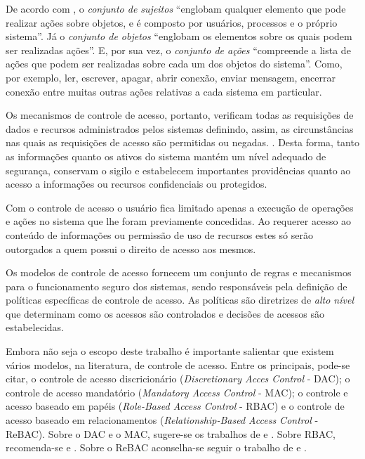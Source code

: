 De acordo com \cite[p. 8]{kropiwiec_policy_nodate}, o \textit{conjunto de sujeitos} ``englobam qualquer elemento que pode realizar ações sobre objetos, e é composto por usuários, processos e o próprio sistema''. Já o \textit{conjunto de objetos} ``englobam os elementos sobre os quais podem ser realizadas ações''. E, por sua vez, o \textit{conjunto de ações} ``compreende a lista de ações que podem ser realizadas sobre cada um dos objetos do sistema''. Como, por exemplo, ler, escrever, apagar, abrir conexão, enviar mensagem, encerrar conexão entre muitas outras ações relativas a cada sistema em particular.

Os mecanismos de controle de acesso, portanto, verificam todas as requisições de dados e recursos administrados pelos sistemas definindo, assim, as circunstâncias nas quais as requisições de acesso são permitidas ou negadas. \cite{sandhu:1996}. Desta forma, tanto as informações quanto os ativos do sistema mantém um nível adequado de segurança, conservam o sigilo e estabelecem importantes providências quanto ao acesso a informações ou recursos confidenciais ou protegidos. \cite{wang_conflicts_2010}

Com o controle de acesso o usuário fica limitado apenas a execução de operações e ações no sistema que lhe foram previamente concedidas. Ao requerer acesso ao conteúdo de informações ou permissão de uso de recursos estes só serão outorgados a quem possui o direito de acesso aos mesmos. \cite{ferraiolo_proposed_2001}

Os modelos de controle de acesso fornecem um conjunto de regras e mecanismos para o funcionamento seguro dos sistemas, sendo responsáveis pela definição de políticas específicas de controle de acesso. As políticas são diretrizes de \textit{alto nível} \cite{monteiro_adocao_2017} que determinam como os acessos são controlados e decisões de acessos são estabelecidas. \cite{di_vimercati_policies_2005} \cite{sarkis2017} \cite{lopes_adopcao_2012}

Embora não seja o escopo deste trabalho é importante salientar que existem vários modelos, na literatura, de controle de acesso. Entre os principais, pode-se citar, o controle de acesso discricionário (\textit{Discretionary Acces Control} - DAC); o controle de acesso mandatório (\textit{Mandatory Access Control} - MAC); o controle e acesso baseado em papéis (\textit{Role-Based Access Control} - RBAC) e o controle de acesso baseado em relacionamentos (\textit{Relationship-Based Access Control} - ReBAC). Sobre o DAC e o MAC, sugere-se os trabalhos de \cite{sandhu:1996} e \cite{di_vimercati_policies_2005}. Sobre RBAC, recomenda-se \cite{ferraiolo_proposed_2001} e \cite{sandhu:1996}. Sobre o ReBAC aconselha-se seguir o trabalho de \cite{bui_efficient_2019} e \cite{fong_relationship-based_2011}.

